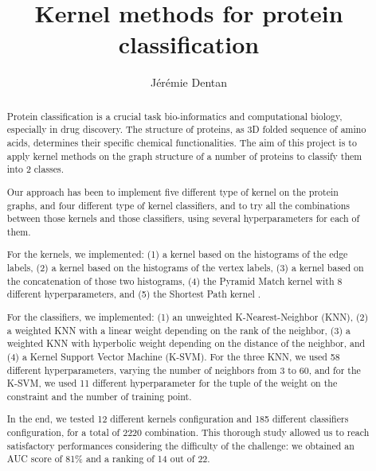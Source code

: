 \documentclass[sigconf, nonacm]{acmart}
\begin{document}
\title{Kernel methods for protein classification}

\author{Jérémie Dentan}

\renewcommand{\shortauthors}{Dentan}

\begin{abstract}

Protein classification is a crucial task bio-informatics and computational biology, especially in drug discovery. The structure of proteins, as 3D folded sequence of amino acids, determines their specific chemical functionalities. The aim of this project is to apply kernel methods on the graph structure of a number of proteins to classify them into 2 classes.

Our approach has been to implement five different type of kernel on the protein graphs, and four different type of kernel classifiers, and to try all the combinations between those kernels and those classifiers, using several hyperparameters for each of them.

For the kernels, we implemented: (1) a kernel based on the histograms of the edge labels, (2) a kernel based on the histograms of the vertex labels, (3) a kernel based on the concatenation of those two histograms, (4) the Pyramid Match kernel \cite{grauman_pyramid_2007} with 8 different hyperparameters, and (5) the Shortest Path kernel \cite{borgwardt_shortest-path_2005}.

For the classifiers, we implemented: (1) an unweighted K-Nearest-Neighbor (KNN), (2) a weighted KNN with a linear weight depending on the rank of the neighbor, (3) a weighted KNN with hyperbolic weight depending on the distance of the neighbor, and (4) a Kernel Support Vector Machine (K-SVM). For the three KNN, we used 58 different hyperparameters, varying the number of neighbors from 3 to 60, and for the K-SVM, we used 11 different hyperparameter for the tuple of the weight on the constraint and the number of training point.

In the end, we tested 12 different kernels configuration and 185 different classifiers configuration, for a total of 2220 combination. This thorough study allowed us to reach satisfactory performances considering the difficulty of the challenge: we obtained an AUC score of 81\% and a ranking of 14 out of 22.

\end{abstract}
\end{document}
